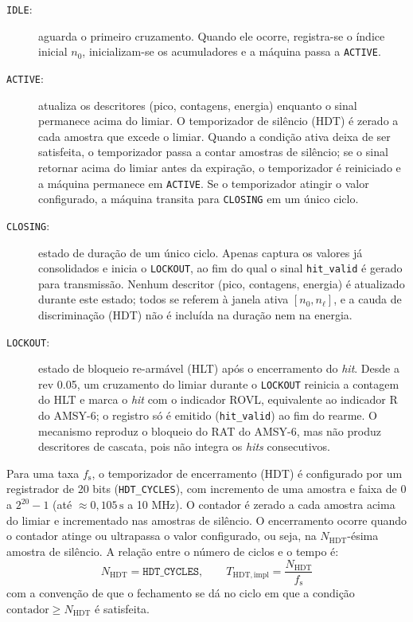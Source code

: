 \begin{description}
	\item[\texttt{IDLE}:] aguarda o primeiro cruzamento. Quando ele ocorre, registra-se o índice inicial \(n_0\), inicializam-se os acumuladores e a máquina passa a \texttt{ACTIVE}.
	
	\item[\texttt{ACTIVE}:] atualiza os descritores (pico, contagens, energia) enquanto o sinal permanece acima do limiar. O temporizador de silêncio (HDT) é zerado a cada amostra que excede o limiar. Quando a condição ativa deixa de ser satisfeita, o temporizador passa a contar amostras de silêncio; se o sinal retornar acima do limiar antes da expiração, o temporizador é reiniciado e a máquina permanece em \texttt{ACTIVE}. Se o temporizador atingir o valor configurado, a máquina transita para \texttt{CLOSING} em um único ciclo.
	
	\item[\texttt{CLOSING}:] estado de duração de um único ciclo. Apenas captura os valores já consolidados e inicia o \texttt{LOCKOUT}, ao fim do qual o sinal \texttt{hit\_valid} é gerado para transmissão. Nenhum descritor (pico, contagens, energia) é atualizado durante este estado; todos se referem à janela ativa \([n_0, n_\ell]\), e a cauda de discriminação (HDT) não é incluída na duração nem na energia.
	
	\item[\texttt{LOCKOUT}:] estado de bloqueio re-armável (HLT) após o encerramento do \textit{hit}. Desde a rev 0.05, um cruzamento do limiar durante o \texttt{LOCKOUT} reinicia a contagem do HLT e marca o \textit{hit} com o indicador ROVL, equivalente ao indicador R do AMSY-6; o registro só é emitido (\texttt{hit\_valid}) ao fim do rearme. O mecanismo reproduz o bloqueio do RAT do AMSY-6, mas não produz descritores de cascata, pois não integra os \textit{hits} consecutivos.
\end{description}

Para uma taxa \(f_{\mathrm{s}}\), o temporizador de encerramento (HDT) é configurado por um registrador de 20 bits (\texttt{HDT\_CYCLES}), com incremento de uma amostra e faixa de 0 a \(2^{20}-1\) (até \(\approx 0{,}105\,\text{s}\) a 10 MHz). O contador é zerado a cada amostra acima do limiar e incrementado nas amostras de silêncio. O encerramento ocorre quando o contador atinge ou ultrapassa o valor configurado, ou seja, na \(N_{\mathrm{HDT}}\)-ésima amostra de silêncio. A relação entre o número de ciclos e o tempo é:
\begin{equation}
	N_{\mathrm{HDT}} = \texttt{HDT\_CYCLES}, \qquad T_{\mathrm{HDT,impl}} = \frac{N_{\mathrm{HDT}}}{f_{\mathrm{s}}}
	\label{v2:eq:ddt_implementado}
\end{equation}
com a convenção de que o fechamento se dá no ciclo em que a condição \(\text{contador} \ge N_{\mathrm{HDT}}\) é satisfeita.


